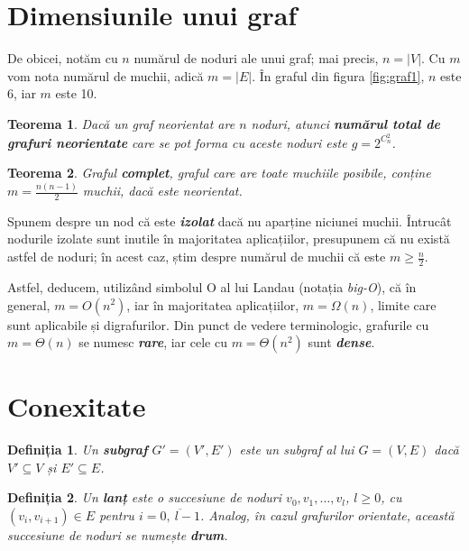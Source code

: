 \documentclass[9pt,a4paper]{report}
\newtheorem{definitie}{Definiția}
\newtheorem{teorema}{Teorema}
\begin{document}
\section{Dimensiunile unui graf}

De obicei, notăm cu $n$ numărul de noduri ale unui graf; mai precis, $n = |V|$. Cu $m$ vom nota numărul de muchii, adică $m = |E|$. În graful din figura \ref{fig:graf1}, $n$ este 6, iar $m$ este 10.

\begin{teorema}
    Dacă un graf neorientat are $n$ noduri, atunci \textbf{\textit{numărul total de grafuri neorientate}} care se pot forma cu aceste noduri este $g = 2^{C_n^2}$.
\end{teorema}

\begin{teorema}
    Graful \textbf{\textit{complet}}, graful care are toate muchiile posibile, conține $m = \frac{n(n-1)}{2}$ muchii, dacă este neorientat.
\end{teorema}

Spunem despre un nod că este \textbf{\textit{izolat}} dacă nu aparține niciunei muchii. Întrucât nodurile izolate sunt inutile în majoritatea aplicațiilor, presupunem că nu există astfel de noduri; în acest caz, știm despre numărul de muchii că este $m \geq \frac{n}{2}$.

Astfel, deducem, utilizând simbolul O al lui Landau (notația \textit{big-O}), că în general, $m = O(n^2)$, iar în majoritatea aplicațiilor, $m = \Omega(n)$, limite care sunt aplicabile și digrafurilor. Din punct de vedere terminologic, grafurile cu $m = \Theta(n)$ se numesc \textbf{\textit{rare}}, iar cele cu $m = \Theta(n^2)$ sunt \textbf{\textit{dense}}.

\section{Conexitate}

\begin{definitie}
    Un \textbf{subgraf} $G' = (V', E')$ este un subgraf al lui $G = (V, E)$ dacă $V' \subseteq V$ și $E' \subseteq E$.
\end{definitie}
\begin{definitie}
    Un \textbf{lanț} este o succesiune de noduri $v_0, v_1, \dots, v_l$, $l \geq 0$, cu $(v_i, v_{i+1}) \in E$ pentru $i = \overline{0, \ l - 1}$. Analog, în cazul grafurilor orientate, această succesiune de noduri se numește \textbf{drum}.
\end{definitie}
\end{document}

